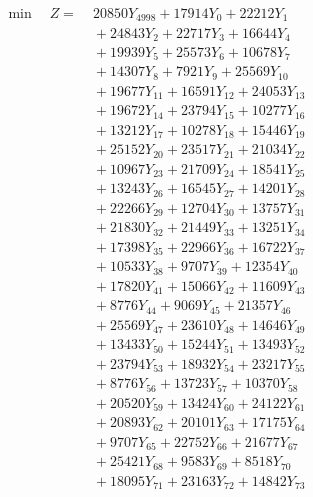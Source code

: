 \documentclass[a4paper,10pt]{article}
\begin{document}
\allowdisplaybreaks
{\small
\begin{align}
\min \quad Z = &\; 20850 Y_{4998} + 17914 Y_{0} + 22212 Y_{1} \\[0.3ex]
&\;  + 24843 Y_{2} + 22717 Y_{3} + 16644 Y_{4} \\[0.3ex]
&\;  + 19939 Y_{5} + 25573 Y_{6} + 10678 Y_{7} \\[0.3ex]
&\;  + 14307 Y_{8} + 7921 Y_{9} + 25569 Y_{10} \\[0.3ex]
&\;  + 19677 Y_{11} + 16591 Y_{12} + 24053 Y_{13} \\[0.3ex]
&\;  + 19672 Y_{14} + 23794 Y_{15} + 10277 Y_{16} \\[0.3ex]
&\;  + 13212 Y_{17} + 10278 Y_{18} + 15446 Y_{19} \\[0.3ex]
&\;  + 25152 Y_{20} + 23517 Y_{21} + 21034 Y_{22} \\[0.3ex]
&\;  + 10967 Y_{23} + 21709 Y_{24} + 18541 Y_{25} \\[0.3ex]
&\;  + 13243 Y_{26} + 16545 Y_{27} + 14201 Y_{28} \\[0.5ex]\allowbreak
&\;  + 22266 Y_{29} + 12704 Y_{30} + 13757 Y_{31} \\[0.3ex]
&\;  + 21830 Y_{32} + 21449 Y_{33} + 13251 Y_{34} \\[0.3ex]
&\;  + 17398 Y_{35} + 22966 Y_{36} + 16722 Y_{37} \\[0.3ex]
&\;  + 10533 Y_{38} + 9707 Y_{39} + 12354 Y_{40} \\[0.3ex]
&\;  + 17820 Y_{41} + 15066 Y_{42} + 11609 Y_{43} \\[0.3ex]
&\;  + 8776 Y_{44} + 9069 Y_{45} + 21357 Y_{46} \\[0.3ex]
&\;  + 25569 Y_{47} + 23610 Y_{48} + 14646 Y_{49} \\[0.3ex]
&\;  + 13433 Y_{50} + 15244 Y_{51} + 13493 Y_{52} \\[0.3ex]
&\;  + 23794 Y_{53} + 18932 Y_{54} + 23217 Y_{55} \\[0.3ex]
&\;  + 8776 Y_{56} + 13723 Y_{57} + 10370 Y_{58} \\[0.5ex]\allowbreak
&\;  + 20520 Y_{59} + 13424 Y_{60} + 24122 Y_{61} \\[0.3ex]
&\;  + 20893 Y_{62} + 20101 Y_{63} + 17175 Y_{64} \\[0.3ex]
&\;  + 9707 Y_{65} + 22752 Y_{66} + 21677 Y_{67} \\[0.3ex]
&\;  + 25421 Y_{68} + 9583 Y_{69} + 8518 Y_{70} \\[0.3ex]
&\;  + 18095 Y_{71} + 23163 Y_{72} + 14842 Y_{73} \\[0.3ex]

\end{align}}
\end{document}

